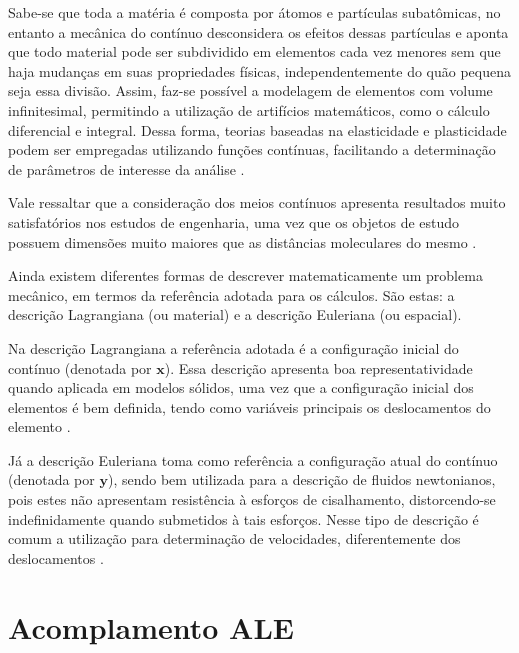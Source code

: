 \documentclass[_ArquivoPrincipal.tex]{subfiles}
\begin{document}
Sabe-se que toda a matéria é composta por átomos e partículas subatômicas, no entanto a mecânica do contínuo desconsidera os efeitos dessas partículas e aponta que todo material pode ser subdividido em elementos cada vez menores sem que haja mudanças em suas propriedades físicas, independentemente do quão pequena seja essa divisão. Assim, faz-se possível a modelagem de elementos com volume infinitesimal, permitindo a utilização de artifícios matemáticos, como o cálculo diferencial e integral. Dessa forma, teorias baseadas na elasticidade e plasticidade podem ser empregadas utilizando funções contínuas, facilitando a determinação de parâmetros de interesse da análise \cite{irgens2008continuum, lai2009introduction, malvern1969introduction}.

Vale ressaltar que a consideração dos meios contínuos apresenta resultados muito satisfatórios nos estudos de engenharia, uma vez que os objetos de estudo possuem dimensões muito maiores que as distâncias moleculares do mesmo \cite{malvern1969introduction, mase2009continuum}.

Ainda existem diferentes formas de descrever matematicamente um problema mecânico, em termos da referência adotada para os cálculos. São estas: a descrição Lagrangiana (ou material) e a descrição Euleriana (ou espacial).

Na descrição Lagrangiana a referência adotada é a configuração inicial do contínuo (denotada por $\mathbf{x}$). Essa descrição apresenta boa representatividade quando aplicada em modelos sólidos, uma vez que a configuração inicial dos elementos é bem definida, tendo como variáveis principais os deslocamentos do elemento \cite{sanches2014fluid, fernandes2019ale}.

Já a descrição Euleriana toma como referência a configuração atual do contínuo (denotada por $\mathbf{y}$), sendo bem utilizada para a descrição de fluidos newtonianos, pois estes não apresentam resistência à esforços de cisalhamento, distorcendo-se indefinidamente quando submetidos à tais esforços. Nesse tipo de descrição é comum a utilização para determinação de velocidades, diferentemente dos deslocamentos \cite{sanches2014fluid, fernandes2019ale}.

\section{Acomplamento ALE} \label{ALE}
\end{document}
